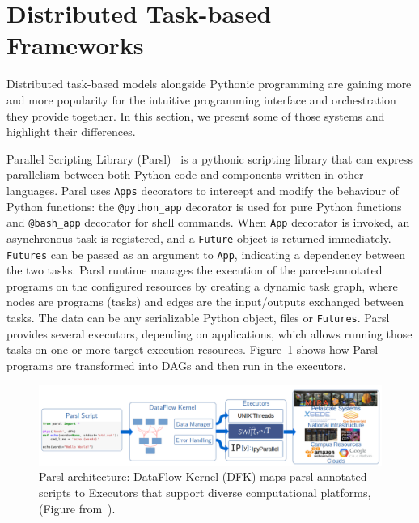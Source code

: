 

\section{Distributed Task-based Frameworks}\label{sec:task-based-frameworks}

Distributed task-based models alongside Pythonic programming are gaining more and more popularity for the intuitive programming interface and orchestration they provide together. In this section, we present some of those systems and highlight their differences.  

Parallel Scripting Library (Parsl)~\cite{babuji2017introducing, babuji2018parsl, babuji_parsl_2019} is a pythonic scripting library that can express parallelism between both Python code and components written in other languages. Parsl uses \texttt{Apps} decorators to intercept and modify the behaviour of Python functions: the \texttt{@python\_app} decorator is used for pure Python functions and \texttt{@bash\_app} decorator for shell commands. When \texttt{App} decorator is invoked, an asynchronous task is registered, and a \texttt{Future} object is returned immediately. \texttt{Futures} can be passed as an argument to \texttt{App}, indicating a dependency between the two tasks. 
Parsl runtime manages the execution of the parcel-annotated programs on the configured resources by creating a dynamic task graph, where nodes are programs (tasks) and edges are the input/outputs exchanged between tasks. The data can be any serializable Python object, files or \texttt{Futures}. 
 Parsl provides several executors, depending on applications, which allows running those tasks on one or more target execution resources. Figure~\ref{figparsl} shows how Parsl programs are transformed into DAGs and then run in the executors.  

\begin{figure}[h!]\centering
\includegraphics[scale=0.44]{figures/parsl.png}
\caption{Parsl architecture: DataFlow Kernel (DFK) maps parsl-annotated scripts to Executors that support diverse computational platforms, (Figure from~\cite{babuji2018parsl}).}
\label{figparsl}
\end{figure}



